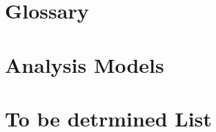 






\begin{appendices}
\chapter{Glossary}
\chapter{Analysis Models}
\chapter{To be detrmined List}
\end{appendices}


